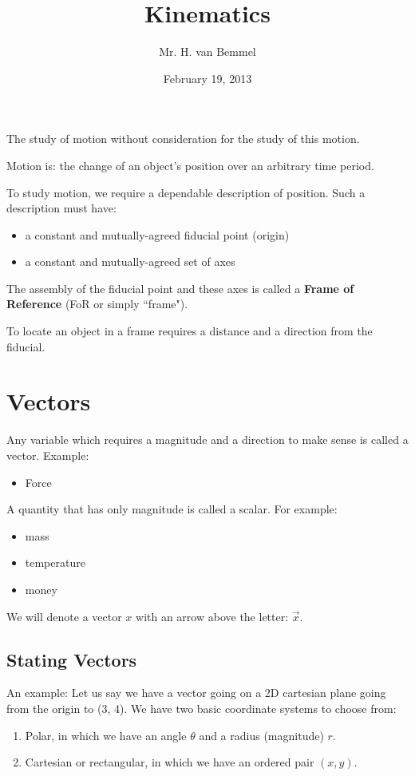 \documentclass[letterpaper]{article}
\begin{document}
\title{Kinematics}
\author{Mr. H. van Bemmel}
\date{February 19, 2013}
\maketitle

The study of motion without consideration for the study of this motion.

Motion is: the change of an object's position over an arbitrary time period.

To study motion, we require a dependable description of position.
Such a description must have:
\begin{itemize}
    \item a constant and mutually-agreed fiducial point (origin)
    \item a constant and mutually-agreed set of axes
\end{itemize}
The assembly of the fiducial point and these axes is called a {\bf Frame of Reference} (FoR or simply ``frame").

To locate an object in a frame requires a distance and a direction from the fiducial.

\section{Vectors}
Any variable which requires a magnitude and a direction to make sense is called a vector.
Example:
\begin {itemize}
    \item Force
\end{itemize}

A quantity that has only magnitude is called a scalar. For example: 
\begin{itemize}
    \item mass
    \item temperature
    \item money
\end{itemize}

We will denote a vector $x$ with an arrow above the letter: $\vec{x}$.

\subsection{Stating Vectors}
An example:
    Let us say we have a vector going on a 2D cartesian plane going from the origin
    to (3, 4). We have two basic coordinate systems to choose from:
    \begin{enumerate}
        \item Polar, in which we have an angle $\theta$ and a radius (magnitude) $r$.
        \item Cartesian or rectangular, in which we have an ordered pair $(x, y)$.
    \end{enumerate}
\end{document}
